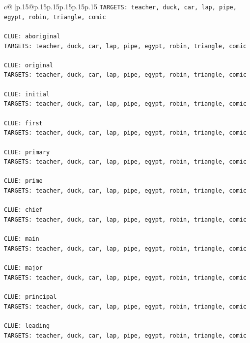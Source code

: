 \documentclass{article}
\begin{document}
{\begin{supertabular}{c@{$\;$}|p{.15\linewidth}@{}p{.15\linewidth}p{.15\linewidth}p{.15\linewidth}p{.15\linewidth}p{.15\linewidth}}
{{{\texttt{TARGETS: teacher, duck, car, lap, pipe, egypt, robin, triangle, comic} \\
\\ 
\texttt{CLUE: aboriginal} \\
\texttt{TARGETS: teacher, duck, car, lap, pipe, egypt, robin, triangle, comic} \\
\\ 
\texttt{CLUE: original} \\
\texttt{TARGETS: teacher, duck, car, lap, pipe, egypt, robin, triangle, comic} \\
\\ 
\texttt{CLUE: initial} \\
\texttt{TARGETS: teacher, duck, car, lap, pipe, egypt, robin, triangle, comic} \\
\\ 
\texttt{CLUE: first} \\
\texttt{TARGETS: teacher, duck, car, lap, pipe, egypt, robin, triangle, comic} \\
\\ 
\texttt{CLUE: primary} \\
\texttt{TARGETS: teacher, duck, car, lap, pipe, egypt, robin, triangle, comic} \\
\\ 
\texttt{CLUE: prime} \\
\texttt{TARGETS: teacher, duck, car, lap, pipe, egypt, robin, triangle, comic} \\
\\ 
\texttt{CLUE: chief} \\
\texttt{TARGETS: teacher, duck, car, lap, pipe, egypt, robin, triangle, comic} \\
\\ 
\texttt{CLUE: main} \\
\texttt{TARGETS: teacher, duck, car, lap, pipe, egypt, robin, triangle, comic} \\
\\ 
\texttt{CLUE: major} \\
\texttt{TARGETS: teacher, duck, car, lap, pipe, egypt, robin, triangle, comic} \\
\\ 
\texttt{CLUE: principal} \\
\texttt{TARGETS: teacher, duck, car, lap, pipe, egypt, robin, triangle, comic} \\
\\ 
\texttt{CLUE: leading} \\
\texttt{TARGETS: teacher, duck, car, lap, pipe, egypt, robin, triangle, comic} \\
}}}
\end{supertabular}}
\end{document}
